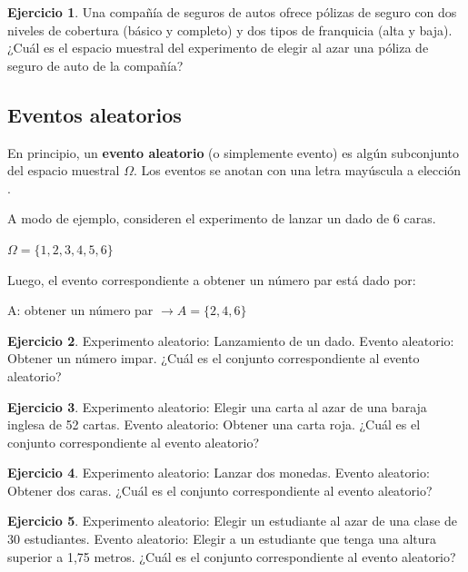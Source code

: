 \documentclass[
  11pt,
]{book}
\theoremstyle{definition}
\theoremstyle{definition}
\theoremstyle{definition}
\newtheorem{exercise}{Ejercicio}[chapter]
\theoremstyle{definition}
\theoremstyle{remark}
\begin{document}
\begin{exercise}
Una compañía de seguros de autos ofrece pólizas de seguro con dos niveles de cobertura (básico y completo) y dos tipos de franquicia (alta y baja). ¿Cuál es el espacio muestral del experimento de elegir al azar una póliza de seguro de auto de la compañía?
\end{exercise}

\subsection{Eventos aleatorios}\label{probabilidad-variables-elementos-eventos}

En principio, un \textbf{evento aleatorio} (o simplemente evento) es algún subconjunto del espacio muestral \(\Omega\). Los eventos se anotan con una letra mayúscula a elección \citep[página 153]{anderson}.

A modo de ejemplo, consideren el experimento de lanzar un dado de 6 caras.

\(\Omega = \lbrace 1,2,3,4,5,6 \rbrace\)

Luego, el evento correspondiente a obtener un número par está dado por:

A: obtener un número par \(\rightarrow A = \lbrace 2,4,6 \rbrace\)

\begin{exercise}
Experimento aleatorio: Lanzamiento de un dado. Evento aleatorio: Obtener un número impar. ¿Cuál es el conjunto correspondiente al evento aleatorio?
\end{exercise}

\begin{exercise}
Experimento aleatorio: Elegir una carta al azar de una baraja inglesa de 52 cartas. Evento aleatorio: Obtener una carta roja. ¿Cuál es el conjunto correspondiente al evento aleatorio?
\end{exercise}

\begin{exercise}
Experimento aleatorio: Lanzar dos monedas. Evento aleatorio: Obtener dos caras. ¿Cuál es el conjunto correspondiente al evento aleatorio?
\end{exercise}

\begin{exercise}
Experimento aleatorio: Elegir un estudiante al azar de una clase de 30 estudiantes. Evento aleatorio: Elegir a un estudiante que tenga una altura superior a 1,75 metros. ¿Cuál es el conjunto correspondiente al evento aleatorio?
\end{exercise}
\end{document}

